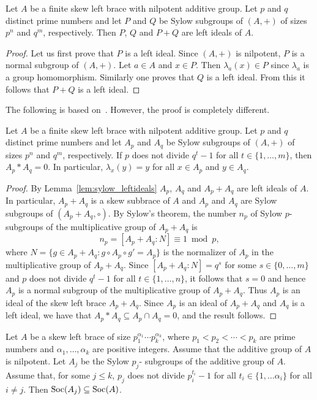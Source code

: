 \begin{lemma}
    \label{lem:sylow_leftideals}
    Let $A$ be a finite skew left brace with nilpotent additive group. Let $p$
    and $q$ distinct prime numbers and let $P$ and $Q$ be Sylow subgroups of
    $(A,+)$ of sizes $p^n$ and $q^m$, respectively. Then $P$, $Q$ and $P+Q$ are
    left ideals of $A$.
\end{lemma}

\begin{proof}
    Let us first prove that $P$ is a left ideal. Since $(A,+)$ is nilpotent,
    $P$ is a normal subgroup of $(A,+)$. Let $a\in A$ and $x\in P$. Then
    $\lambda_a(x)\in P$ since $\lambda_a$ is a group homomorphism. Similarly
    one proves that $Q$ is a left ideal. From this it follows that $P+Q$ is a
    left ideal.
\end{proof}

The following is based on~\cite[Theorem 5(1)]{MR3765444}.
However, the proof is completely different.

\begin{theorem}
\label{thm:P*Q=0} Let $A$ be a finite skew left brace with nilpotent
additive group. Let $p$ and $q$ distinct prime numbers and let $A_p$
and $A_q$ be Sylow subgroups of $(A,+)$ of sizes $p^n$ and $q^m$,
respectively. If $p$ does not divide $q^t-1$ for all
$t\in\{1,\dots,m\}$, then $A_p*A_q=0$. In particular,
$\lambda_x(y)=y$ for all $x\in A_p$ and $y\in A_q$.
\end{theorem}

\begin{proof}
By Lemma~\ref{lem:sylow_leftideals} $A_p$, $A_q$ and $A_p+A_q$
are left ideals of $A$. In particular,  $A_p+A_q$ is a skew subbrace
of $A$ and $A_p$ and $A_q$ are Sylow subgroups of
$(A_p+A_q,\circ)$. By Sylow's theorem, the number $n_p$ of Sylow
$p$-subgroups of the multiplicative group of $A_p+A_q$ is
\[
n_p=[A_p+A_q:N]\equiv 1\bmod p,
\]
where $N=\{g\in A_p+A_q:g\circ A_p\circ g'=A_p\}$ is the normalizer
of $A_p$ in the multiplicative group of $A_p+A_q$. Since
$[A_p+A_q:N]=q^s$ for some $s\in\{0,\dots,m\}$ and $p$ does not
divide $q^t-1$ for all $t\in\{1,\dots,n\}$, it follows that $s=0$
and hence $A_p$ is a normal subgroup of the multiplicative group of
$A_p+A_q$. Thus $A_p$ is an ideal of the skew left brace
$A_p+A_q$. Since $A_p$ is an ideal of $A_p+A_q$ and $A_q$ is a left
ideal, we have that $A_p*A_q\subseteq A_p\cap A_q=0$, and the result
follows.
\end{proof}


\begin{corollary}
Let $A$ be a skew left brace of size $p_1^{\alpha_1}\cdots
p_k^{\alpha_k}$, where $p_1<p_2<\cdots<p_k$ are prime numbers and
$\alpha_1,\dots,\alpha_k$ are positive integers. Assume that the
additive group of $A$ is nilpotent. Let $A_j$ be the Sylow $p_j$-
subgroups of the additive group of $A$. Assume that, for some $j\leq k$,
$p_j$ does not divide $p_i^{t_i}-1$ for all $t_i\in\{
1,\dots \alpha_i\}$ for all $i\neq j$. Then $\operatorname{Soc}(A_j)\subseteq
\operatorname{Soc}(A)$.
\end{corollary}

